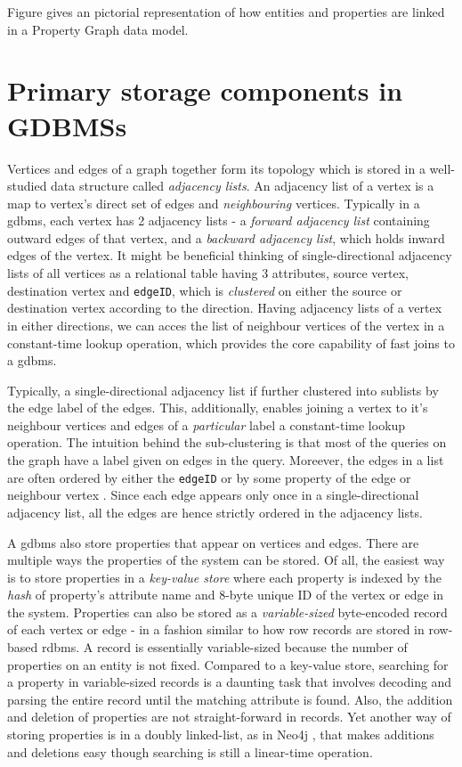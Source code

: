 Figure \cite{property} gives an pictorial representation of how entities and properties are linked in a Property Graph data model.

\section{Primary storage components in GDBMSs}
\label{sec:storage-components}

Vertices and edges of a graph together form its topology which is stored in a well-studied data structure called \emph{adjacency lists}. An adjacency list of a vertex is a map to vertex's direct set of edges and \emph{neighbouring} vertices. Typically in a \gls{gdbms}, each vertex has 2 adjacency lists - a \emph{forward adjacency list} containing outward edges of that vertex, and a \emph{backward adjacency list}, which holds inward edges of the vertex. It might be beneficial thinking of single-directional adjacency lists of all vertices as a relational table having 3 attributes, source vertex, destination vertex and \texttt{edgeID}, which is \emph{clustered} on either the source or destination vertex according to the direction. Having adjacency lists of a vertex in either directions, we can acces the list of neighbour vertices of the vertex in a constant-time lookup operation, which provides the core capability of fast joins to a \gls{gdbms}. 

Typically, a single-directional adjacency list if further clustered into sublists by the edge label of the edges. This, additionally, enables joining a vertex to it's neighbour vertices and edges of a \emph{particular} label a constant-time lookup operation. The intuition behind the sub-clustering is that most of the queries on the graph have a label given on edges in the query. Moreever, the edges in a list are often ordered by either the \texttt{edgeID} or by some property of the edge or neighbour vertex \cite{a+indexes}. Since each edge appears only once in a single-directional adjacency list, all the edges are hence strictly ordered in the adjacency lists.

A \gls{gdbms} also store properties that appear on vertices and edges. There are multiple ways the properties of the system can be stored. Of all, the easiest way is to store properties in a \emph{key-value store} where each property is indexed by the \emph{hash} of property's attribute name and 8-byte unique ID of the vertex or edge in the system. Properties can also be stored as a \emph{variable-sized} byte-encoded record of each vertex or edge - in a fashion similar to how row records are stored in row-based \gls{rdbms}. A record is essentially variable-sized because the number of properties on an entity is not fixed. Compared to a key-value store, searching for a property in variable-sized records is a daunting task that involves decoding and parsing the entire record until the matching attribute is found. Also, the addition and deletion of properties are not straight-forward in records. Yet another way of storing properties is in a doubly linked-list, as in Neo4j \cite{neo4j}, that makes additions and deletions easy though searching is still a linear-time operation.

